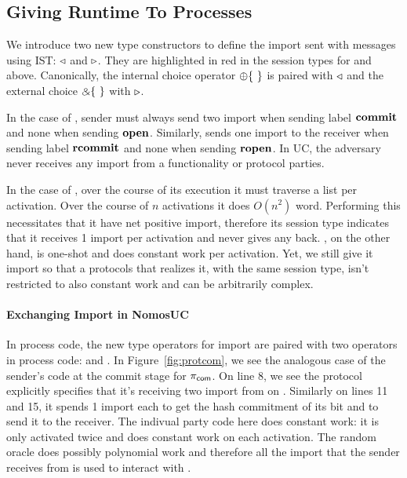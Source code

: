 \subsection{Giving Runtime To Processes}
We introduce two new type constructors to define the import sent with messages using IST: $\triangleleft$ and $\triangleright$.
They are highlighted in red in the session types for \Fcom and \Fro above.
Canonically, the internal choice operator $\ichoice$ is paired with $\triangleleft$ and the external choice $\echoice$ with $\triangleright$.

In the case of \Fcom, sender must always send two import when sending label $\mathbf{commit}$ and none when sending $\mathbf{open}$.
Similarly, \Fcom sends one import to the receiver when sending label $\mathbf{rcommit}$ and none when sending $\mathbf{ropen}$.
In UC, the adversary never receives any import from a functionality or protocol parties.

In the case of \Fro, over the course of its execution it must traverse a list per activation.
Over the course of $n$ activations it does $O(n^2)$ word. 
Performing this necessitates that it have net positive import, therefore its session type indicates that it receives 1 import per activation and never gives any back.
\Fcom, on the other hand, is one-shot and does constant work per activation. Yet, we still give it import so that a protocols that realizes it, with the same session type, isn't restricted to also constant work and can be arbitrarily complex.



\paragraph{Exchanging Import in NomosUC}
In process code, the new type operators for import are paired with two operators in process code: \ipay and \iget.
In Figure~\ref{fig:protcom}, we see the analogous case of the sender's code at the commit stage for $\pi_{\mathsf{com}}$. 
On line 8, we see the protocol explicitly specifies that it's receiving two import from \Z on .
Similarly on lines 11 and 15, it spends 1 import each to get the hash commitment of its bit and to send it to the receiver.
The indivual party code here does constant work: it is only activated twice and does constant work on each activation.
The random oracle does possibly polynomial work and therefore all the import that the sender receives from \Z is used to interact with \Fro.

